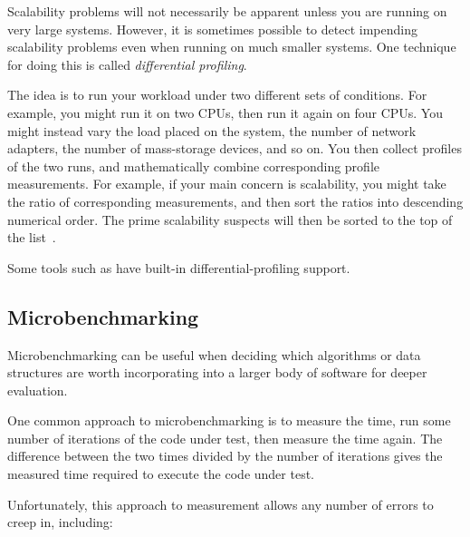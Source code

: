 Scalability problems will not necessarily be apparent unless you are running
on very large systems.
However, it is sometimes possible to detect impending scalability problems
even when running on much smaller systems.
One technique for doing this is called \emph{differential profiling}.

The idea is to run your workload under two different sets of conditions.
For example, you might run it on two CPUs, then run it again on four
CPUs.
You might instead vary the load placed on the system, the number of
network adapters, the number of mass-storage devices, and so on.
You then collect profiles of the two runs, and mathematically combine
corresponding profile measurements.
For example, if your main concern is scalability, you might take the
ratio of corresponding measurements, and then sort the ratios into
descending numerical order.
The prime scalability suspects will then be sorted to the top of the
list~\cite{McKenney95a,McKenney99b}.

Some tools such as  have built-in differential-profiling
support.

\subsection{Microbenchmarking}
\label{sec:debugging:Microbenchmarking}

Microbenchmarking can be useful when deciding which algorithms or
data structures are worth incorporating into a larger body of software
for deeper evaluation.

One common approach to microbenchmarking is to measure the time,
run some number of iterations of the code
under test, then measure the time again.
The difference between the two times divided by the number of iterations
gives the measured time required to execute the code under test.

Unfortunately, this approach to measurement allows any number of errors
to creep in, including:

